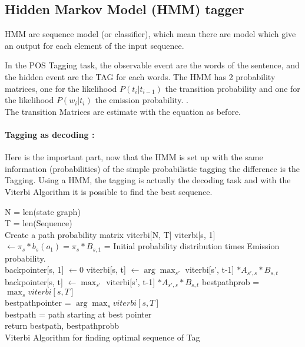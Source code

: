 		\subsection{Hidden Markov Model (HMM) tagger}

			HMM are sequence model (or classifier), which mean there are model which give an output for each element of the input sequence. 


			In the POS Tagging task, the observable event are the words of the sentence, and the hidden event are the TAG for each words. The HMM has 2 probability matrices, one for the likelihood $P(t_i | t_{i-1})$ the transition probability and one for the likelihood $P(w_i | t_{i} )$ the emission probability. .\\
			The transition Matrices are estimate with the equation as before. 

			\paragraph*{Tagging as decoding : }
			Here is the important part, now that the HMM is set up with the same information (probabilities) of the simple probabilistic tagging the difference is the Tagging. Using a HMM, the tagging is actually the decoding task and with the Viterbi Algorithm it is possible to find the best sequence.

			\begin{algorithm}[H]
				N = len(state graph)\\
				T = len(Sequence)\\
				Create a path probability matrix viterbi[N, T]				
					{
						viterbi[s, 1] $\leftarrow \pi_s * b_s(o_1) =  \pi_s * B_{s, 1}$ = Initial probability distribution times Emission probability.\\
						backpointer[s, 1] $ \leftarrow 0$  
					}
					{
						{
							viterbi[s, t] $\leftarrow \arg \max_{s'}$ viterbi[s', t-1] $* A_{s', s} * B_{s, t}$\\
							backpointer[s, t] $\leftarrow \max_{s'}$ viterbi[s', t-1] $* A_{s', s} * B_{s, t}$
						}
					}
				bestpathprob = $\max_s viterbi[s, T]$\\
				bestpathpointer = $\arg\max_s viterbi[s, T]$\\
				bestpath = path starting at best pointer\\
				return bestpath, bestpathprobb\\
				
				\caption{Viterbi Algorithm for finding optimal sequence of Tag}
			\end{algorithm}
